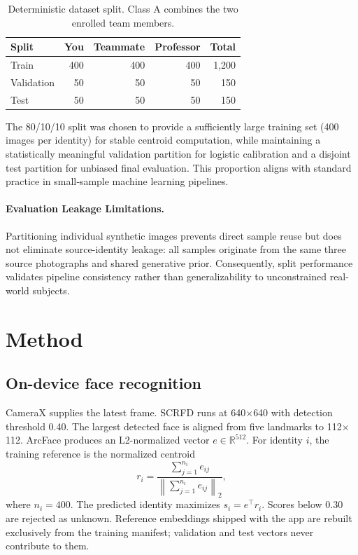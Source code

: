 \documentclass{article}
\begin{document}
\begin{table}[t]
  \caption{Deterministic dataset split. Class A combines the two enrolled team members.}
  \label{tab:splits}
  \centering
  \begin{tabular}{lrrrr}
    \toprule
    Split & You & Teammate & Professor & Total \\
    \midrule
    Train & 400 & 400 & 400 & 1,200 \\
    Validation & 50 & 50 & 50 & 150 \\
    Test & 50 & 50 & 50 & 150 \\
    \bottomrule
  \end{tabular}
\end{table}

The 80/10/10 split was chosen to provide a sufficiently large training set (400 images per identity) for stable centroid computation, while maintaining a statistically meaningful validation partition for logistic calibration and a disjoint test partition for unbiased final evaluation. This proportion aligns with standard practice in small‑sample machine learning pipelines.

\paragraph{Evaluation Leakage Limitations.}
Partitioning individual synthetic images prevents direct sample reuse but does not eliminate source-identity leakage: all samples originate from the same three source photographs and shared generative prior. Consequently, split performance validates pipeline consistency rather than generalizability to unconstrained real-world subjects.

\section{Method}

\subsection{On-device face recognition}

CameraX supplies the latest frame. SCRFD runs at 640$\times$640 with detection threshold 0.40. The largest detected face is aligned from five landmarks to 112$\times$112. ArcFace produces an L2-normalized vector $e\in\mathbb{R}^{512}$. For identity $i$, the training reference is the normalized centroid
\begin{equation}
  r_i = \frac{\sum_{j=1}^{n_i} e_{ij}}{\left\|\sum_{j=1}^{n_i} e_{ij}\right\|_2},
\end{equation}
where $n_i=400$. The predicted identity maximizes $s_i=e^\top r_i$. Scores below 0.30 are rejected as unknown. Reference embeddings shipped with the app are rebuilt exclusively from the training manifest; validation and test vectors never contribute to them.
\end{document}

